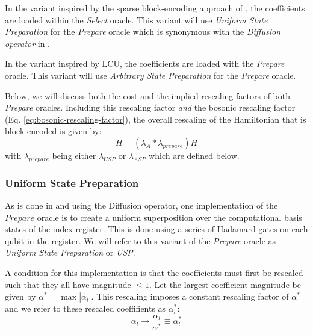 In the variant inspired by the sparse block-encoding approach of \cite{camps2024explicit, liu2024efficient}, the coefficients are loaded within the \textit{Select} oracle.
This variant will use \textit{Uniform State Preparation} for the \textit{Prepare} oracle which is synonymous with the \textit{Diffusion operator} in \cite{camps2024explicit, liu2024efficient}.

In the variant inspired by LCU, the coefficients are loaded with the \textit{Prepare} oracle.
This variant will use \textit{Arbitrary State Preparation} for the \textit{Prepare} oracle.

Below, we will discuss both the cost and the implied rescaling factors of both \textit{Prepare} oracles.
Including this rescaling factor \textit{and} the bosonic rescaling factor (Eq. \ref{eq:bosonic-rescaling-factor}), the overall rescaling of the Hamiltonian that is block-encoded is given by:
\begin{equation}
    \label{eq:post-process}
    H = (\lambda_A * \lambda_{prepare}) \bar{H}
\end{equation}
with $\lambda_{prepare}$ being either $\lambda_{USP}$ or $\lambda_{ASP}$ which are defined below.


\subsubsection{Uniform State Preparation}
\label{subsubsec:usp}

As is done in \cite{camps2024explicit} and \cite{liu2024efficient} using the Diffusion operator, one implementation of the $\textit{Prepare}$ oracle is to create a uniform superposition over the computational basis states of the index register.
This is done using a series of Hadamard gates on each qubit in the register.
We will refer to this variant of the \textit{Prepare} oracle as \textit{Uniform State Preparation} or \textit{USP}.

A condition for this implementation is that the coefficients must first be rescaled such that they all have magnitude $\leq 1$.
Let the largest coefficient magnitude be given by $\alpha^* = \max{|\tilde{\alpha_l}|}$.
This rescaling imposes a constant rescaling factor of $\alpha^*$ and we refer to these rescaled coeffifients as $\alpha_l^*$:
\begin{equation}
    \label{eq:usp-coeff-rescaling}
    \alpha_l \rightarrow \frac{\alpha_l}{\alpha^*} \equiv \alpha_l^*
\end{equation}

